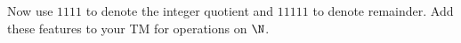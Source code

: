 Now use $1111$ to denote the integer quotient
and $11111$ to denote remainder.
Add these features to your TM for operations on $\N$.
